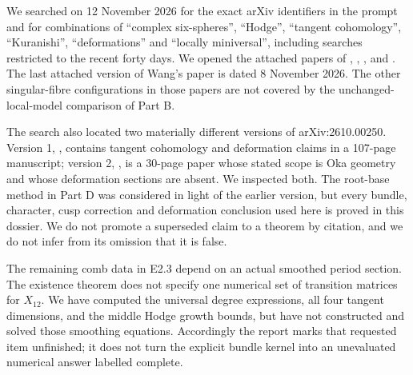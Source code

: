We searched on 12 November 2026 for the exact arXiv identifiers in the
prompt and for combinations of ``complex six-spheres'', ``Hodge'',
``tangent cohomology'', ``Kuranishi'', ``deformations'' and
``locally miniversal'', including searches restricted to the recent
forty days. We opened the attached papers of \citet{Engel2026},
\citet{ViaclovskyLog2026,ViaclovskyCombs2026,ViaclovskyTwo2026},
\citet{LiuRollenske2026}, \citet{Yang2026} and \citet{Wang2026}.
The last attached version of Wang's paper is dated 8 November 2026.
The other singular-fibre configurations in those papers are not
covered by the unchanged-local-model comparison of Part B.

The search also located two materially different versions of
arXiv:2610.00250. Version 1, \citet{DuEtAl2026v1}, contains tangent
cohomology and deformation claims in a 107-page manuscript; version 2,
\citet{DuEtAl2026v2}, is a 30-page paper whose stated scope is Oka
geometry and whose deformation sections are absent. We inspected
both. The root-base method in Part D was considered in light of the
earlier version, but every bundle, character, cusp correction and
deformation conclusion used here is proved in this dossier. We do
not promote a superseded claim to a theorem by citation, and we do
not infer from its omission that it is false.

The remaining comb data in E2.3 depend on an actual smoothed period
section. The existence theorem does not specify one numerical set of
transition matrices for $X_{12}$. We have computed the universal
degree expressions, all four tangent dimensions, and the middle
Hodge growth bounds, but have
not constructed and solved those smoothing equations. Accordingly
the report marks that requested item unfinished; it does not turn
the explicit bundle kernel into an unevaluated numerical answer
labelled complete.
